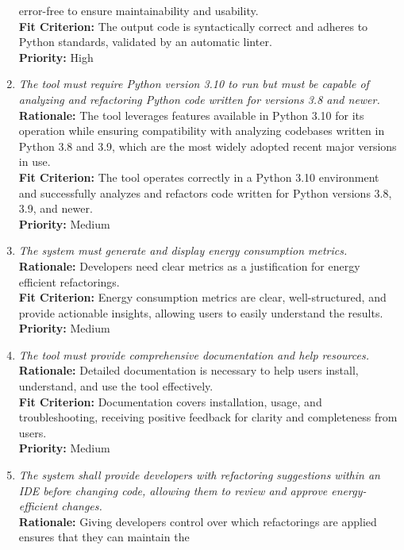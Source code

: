 \documentclass[12pt]{article}
\begin{document}
\begin{enumerate}[label=FR \arabic*., wide=0pt, leftmargin=*]
    error-free to ensure maintainability and usability.\\
    {\bf Fit Criterion:} The output code is syntactically correct and
    adheres to Python standards, validated by an automatic linter.\\
    {\bf Priority:} High
  \item \emph{The tool must require Python version 3.10 to run but
      must be capable of analyzing and refactoring Python code written
    for versions 3.8 and newer.}\\[2mm]
    {\bf Rationale:} The tool leverages features available in Python
    3.10 for its operation while ensuring compatibility with
    analyzing codebases written in Python 3.8 and 3.9, which are the
    most widely adopted recent major versions in use.\\
    {\bf Fit Criterion:} The tool operates correctly in a Python 3.10
    environment and successfully analyzes and refactors code written
    for Python versions 3.8, 3.9, and newer.\\
    {\bf Priority:} Medium
  \item \emph{The system must generate and display energy consumption metrics.}\\[2mm]
    {\bf Rationale:} Developers need clear metrics as a justification for energy efficient refactorings.\\
    {\bf Fit Criterion:} Energy consumption metrics are clear, well-structured, and
    provide actionable insights, allowing users to easily understand the results.\\
    {\bf Priority:} Medium
  \item \emph{The tool must provide comprehensive documentation and
    help resources.}\\[2mm]
    {\bf Rationale:} Detailed documentation is necessary to help
    users install, understand, and use the tool effectively.\\
    {\bf Fit Criterion:} Documentation covers installation, usage,
    and troubleshooting, receiving positive feedback for clarity and
    completeness from users.\\
    {\bf Priority:} Medium
  \item \emph{The system shall provide developers with refactoring
      suggestions within an IDE before changing code, allowing them
    to review and approve energy-efficient changes.}\\[2mm]
    {\bf Rationale:} Giving developers control over which
    refactorings are applied ensures that they can maintain the

\end{enumerate}
\end{document}
